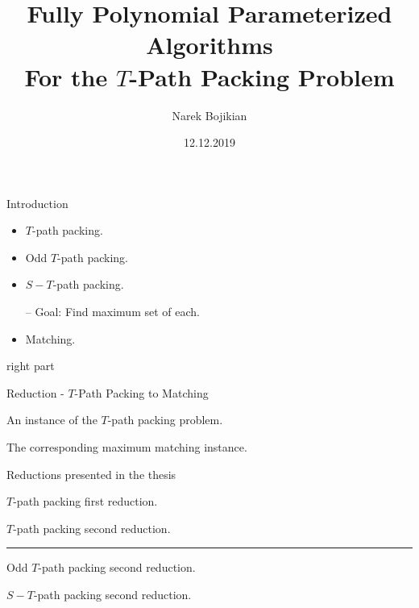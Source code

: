 \documentclass{beamer}
\title{Fully Polynomial Parameterized Algorithms\\For the $T$-Path Packing Problem} %
\author{Narek Bojikian} %
\institute[Hu-Berlin]
{
	Humboldt University of Berlin
}
\date{12.12.2019} %
\begin{document}
\begin{frame}
\titlepage %
\end{frame}
\begin{frame}[t]{Introduction}
	\vspace{10px}
	\begin{minipage}[t]{0.6\linewidth}
		\begin{itemize}[<+->]
			\item $T$-path packing.
			\item Odd $T$-path packing.
			\item $S-T$-path packing.
			\item[--] Goal: Find maximum set of each.
			\item Matching.
		\end{itemize}
	\end{minipage}\hfill
	\begin{minipage}[t]{0.3\linewidth}
		\centering
		right part
	\end{minipage}
\end{frame}
\begin{frame}[t]{Reduction - $T$-Path Packing to Matching}
	\begin{minipage}[t][.4\textheight][t]{\linewidth}
		An instance of the $T$-path packing problem.
	\end{minipage}
	\hfill
	\begin{minipage}[t][.4\textheight][t]{\linewidth}
		The corresponding maximum matching instance.
	\end{minipage}
\end{frame}

\begin{frame}[t]{Reductions presented in the thesis}
	\begin{minipage}[t][.3\textheight][t]{\linewidth}
		\begin{minipage}[t][\textheight][t]{.45\linewidth}

			$T$-path packing first reduction.
			
		\end{minipage}
		\hfill
		\vline
		\hfill
		\begin{minipage}[t][\textheight][t]{.45\linewidth}
			$T$-path packing second reduction.
		\end{minipage}
	\end{minipage}
		\vfill
		\hrule
		\vfill
	\begin{minipage}[t][.3\textheight][t]{\linewidth}
		\begin{minipage}[t][\textheight][t]{.45\linewidth}
			Odd $T$-path packing second reduction.
		\end{minipage}
		\hfill
		\hfill
		\begin{minipage}[t][\textheight][t]{.45\linewidth}
			$S-T$-path packing second reduction.
		\end{minipage}
	\end{minipage}

\end{frame}
\end{document}
